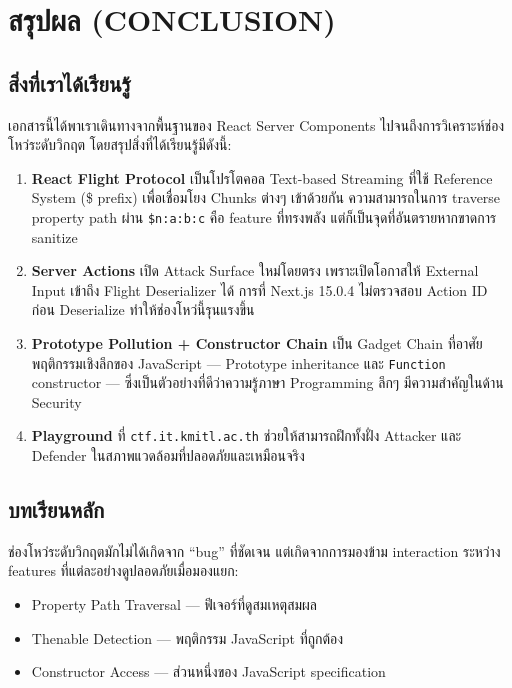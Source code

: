 \documentclass[12pt,oneside]{report}
\begin{document}
\chapter{สรุปผล (CONCLUSION)}

\section{สิ่งที่เราได้เรียนรู้}

เอกสารนี้ได้พาเราเดินทางจากพื้นฐานของ React Server Components ไปจนถึงการวิเคราะห์ช่องโหว่ระดับวิกฤต โดยสรุปสิ่งที่ได้เรียนรู้มีดังนี้:

\begin{enumerate}
    \item \textbf{React Flight Protocol} เป็นโปรโตคอล Text-based Streaming ที่ใช้ Reference System (\$ prefix) เพื่อเชื่อมโยง Chunks ต่างๆ เข้าด้วยกัน ความสามารถในการ traverse property path ผ่าน \texttt{\$n:a:b:c} คือ feature ที่ทรงพลัง แต่ก็เป็นจุดที่อันตรายหากขาดการ sanitize
    \item \textbf{Server Actions} เปิด Attack Surface ใหม่โดยตรง เพราะเปิดโอกาสให้ External Input เข้าถึง Flight Deserializer ได้ การที่ Next.js 15.0.4 ไม่ตรวจสอบ Action ID ก่อน Deserialize ทำให้ช่องโหว่นี้รุนแรงขึ้น
    \item \textbf{Prototype Pollution + Constructor Chain} เป็น Gadget Chain ที่อาศัยพฤติกรรมเชิงลึกของ JavaScript — Prototype inheritance และ \texttt{Function} constructor — ซึ่งเป็นตัวอย่างที่ดีว่าความรู้ภาษา Programming ลึกๆ มีความสำคัญในด้าน Security
    \item \textbf{Playground} ที่ \texttt{ctf.it.kmitl.ac.th} ช่วยให้สามารถฝึกทั้งฝั่ง Attacker และ Defender ในสภาพแวดล้อมที่ปลอดภัยและเหมือนจริง
\end{enumerate}

\section{บทเรียนหลัก}

ช่องโหว่ระดับวิกฤตมักไม่ได้เกิดจาก ``bug'' ที่ชัดเจน แต่เกิดจากการมองข้าม interaction ระหว่าง features ที่แต่ละอย่างดูปลอดภัยเมื่อมองแยก:

\begin{itemize}[leftmargin=1.5cm]
    \item Property Path Traversal — ฟีเจอร์ที่ดูสมเหตุสมผล
    \item Thenable Detection — พฤติกรรม JavaScript ที่ถูกต้อง
    \item Constructor Access — ส่วนหนึ่งของ JavaScript specification
\end{itemize}
\end{document}
